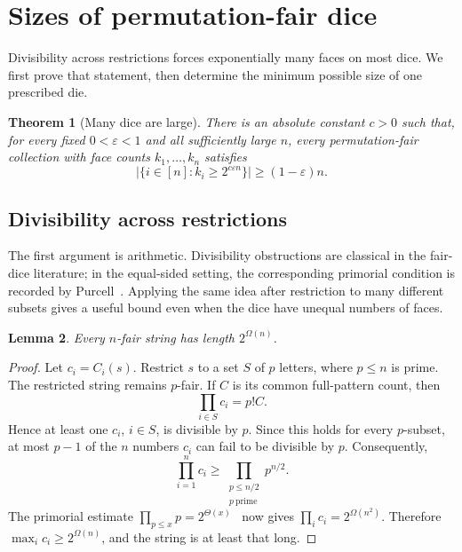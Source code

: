 \documentclass[11pt]{article}
\newtheorem{theorem}{Theorem}[section]
\newtheorem{lemma}[theorem]{Lemma}
\theoremstyle{definition}
\theoremstyle{remark}
\begin{document}
\section{Sizes of permutation-fair dice}\label{sec:lower}

Divisibility across restrictions forces exponentially many faces on most
dice. We first prove that statement, then determine the minimum possible
size of one prescribed die.

\begin{theorem}[Many dice are large]\label{thm:many-large}
There is an absolute constant \(c>0\) such that, for every fixed
\(0<\varepsilon<1\) and all sufficiently large \(n\), every
permutation-fair collection with face counts \(k_1,\ldots,k_n\) satisfies
\[
  \bigl|\{i\in[n]: k_i\geq2^{c\varepsilon n}\}\bigr|
  \geq (1-\varepsilon)n.
\]
\end{theorem}

\subsection{Divisibility across restrictions}

The first argument is arithmetic.  Divisibility obstructions are classical
in the fair-dice literature; in the equal-sided setting, the corresponding
primorial condition is recorded by Purcell~\cite{purcell}.  Applying the same
idea after restriction to many different subsets gives a useful bound even
when the dice have unequal numbers of faces.

\begin{lemma}\label{lem:exp-lower}
Every \(n\)-fair string has length \(2^{\Omega(n)}\).
\end{lemma}

\begin{proof}
Let \(c_i=C_i(s)\).  Restrict \(s\) to a set \(S\) of \(p\) letters, where
\(p\leq n\) is prime.  The restricted string remains \(p\)-fair.  If \(C\) is
its common full-pattern count, then
\[
  \prod_{i\in S}c_i=p!C.
\]
Hence at least one \(c_i\), \(i\in S\), is divisible by \(p\).  Since this
holds for every \(p\)-subset, at most \(p-1\) of the \(n\) numbers \(c_i\) can
fail to be divisible by \(p\).  Consequently,
\[
  \prod_{i=1}^nc_i
  \geq\prod_{\substack{p\leq n/2\\p\ \mathrm{prime}}}p^{n/2}.
\]
The primorial estimate
\(\prod_{p\leq x}p=2^{\Theta(x)}\)~\cite{finch2003} now gives
\(\prod_i c_i=2^{\Omega(n^2)}\).  Therefore
\(\max_i c_i\geq2^{\Omega(n)}\), and the string is at least that long.
\end{proof}
\end{document}
